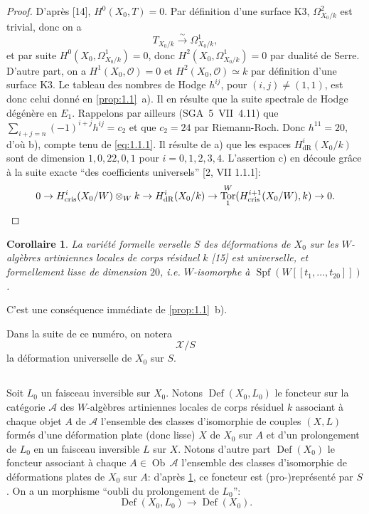 \documentclass[12pt,a4paper]{article}
\theoremstyle{plain}
\newtheorem{corollary}[theorem]{Corollaire}
\theoremstyle{definition}
\theoremstyle{remark}
\DeclareMathOperator{\Def}{Def}
\DeclareMathOperator{\Spf}{Spf}
\DeclareMathOperator{\Tor}{Tor}
\DeclareMathOperator{\Ob}{Ob}
\newcommand{\cris}{\mathrm{cris}}
\begin{document}
\begin{proof}
D'après [14], $H^0(X_0, T) = 0$. Par définition d'une surface K3, $\Omega_{X_0/k}^2$ est trivial, donc on a
\begin{equation}\label{eq:1.1.1}
T_{X_0/k} \xrightarrow{\sim} \Omega_{X_0/k}^1,
\end{equation}
et par suite $H^0(X_0, \Omega_{X_0/k}^1) = 0$, donc $H^2(X_0, \Omega_{X_0/k}^1) = 0$ par dualité de Serre. D'autre part, on a $H^1(X_0, \mathcal{O}) = 0$ et $H^2(X_0, \mathcal{O}) \simeq k$ par définition d'une surface K3. Le tableau des nombres de Hodge $h^{ij}$, pour $(i,j) \neq (1,1)$, est donc celui donné en \ref{prop:1.1}~a). Il en résulte que la suite spectrale de Hodge dégénère en $E_1$. Rappelons par ailleurs (SGA~5~VII~4.11) que $\sum_{i+j=n} (-1)^{i+j} h^{ij} = c_2$ et que $c_2 = 24$ par Riemann-Roch. Donc $h^{11} = 20$, d'où b), compte tenu de \eqref{eq:1.1.1}. Il résulte de a) que les espaces $H^i_{\mathrm{dR}}(X_0/k)$ sont de dimension $1, 0, 22, 0, 1$ pour $i = 0, 1, 2, 3, 4$. L'assertion c) en découle grâce à la suite exacte ``des coefficients universels'' [2, VII 1.1.1]:
\[
0 \to H^i_{\cris}(X_0/W) \otimes_W k \to H^i_{\mathrm{dR}}(X_0/k) \to \Tor^W_1(H^{i+1}_{\cris}(X_0/W), k) \to 0. \qedhere
\]
\end{proof}

\begin{corollary}\label{cor:1.2}
La variété formelle verselle $S$ des déformations de $X_0$ sur les $W$-algèbres artiniennes locales de corps résiduel $k$ [15] est universelle, et formellement lisse de dimension $20$, i.e. $W$-isomorphe à $\Spf(W[[t_1, \ldots, t_{20}]])$.
\end{corollary}

C'est une conséquence immédiate de \ref{prop:1.1}~b).

Dans la suite de ce numéro, on notera
\begin{equation}\label{eq:1.3}
\mathcal{X}/S
\end{equation}
la déformation universelle de $X_0$ sur $S$.

\subsection{}

Soit $L_0$ un faisceau inversible sur $X_0$. Notons $\Def(X_0, L_0)$ le foncteur sur la catégorie $\mathcal{A}$ des $W$-algèbres artiniennes locales de corps résiduel $k$ associant à chaque objet $A$ de $\mathcal{A}$ l'ensemble des classes d'isomorphie de couples $(X, L)$ formés d'une déformation plate (donc lisse) $X$ de $X_0$ sur $A$ et d'un prolongement de $L_0$ en un faisceau inversible $L$ sur $X$. Notons d'autre part $\Def(X_0)$ le foncteur associant à chaque $A \in \Ob\,\mathcal{A}$ l'ensemble des classes d'isomorphie de déformations plates de $X_0$ sur $A$: d'après \ref{cor:1.2}, ce foncteur est (pro-)représenté par $S$. On a un morphisme ``oubli du prolongement de $L_0$'':
\begin{equation}\label{eq:1.4.1}
\Def(X_0, L_0) \to \Def(X_0).
\end{equation}
\end{document}
